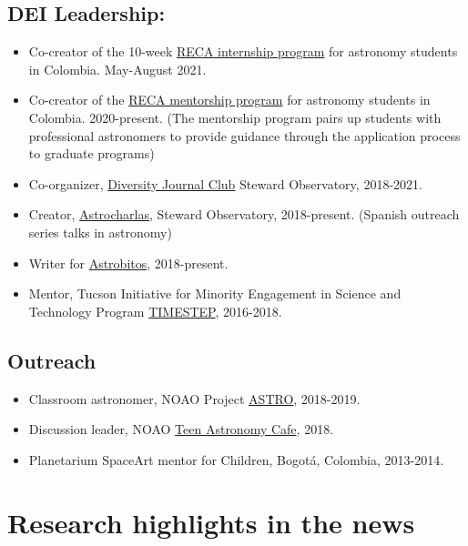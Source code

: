 \documentclass[UTF8]{article}
\begin{document}
\subsection*{DEI Leadership:}
\begin{itemize}
  \setlength\itemsep{0.0em}
  \renewcommand\labelitemi{$\cdot$}
\item Co-creator of the 10-week
  \href{https://recastronomia.github.io/internship/}{RECA internship program}
  for astronomy students in Colombia. May-August 2021.
\item Co-creator of the \href{https://recastronomia.github.io/mentores/}{RECA mentorship program} for astronomy students in Colombia. 2020-present.
  (The mentorship program pairs up students with professional astronomers to
  provide guidance through the application process to graduate programs)
\item Co-organizer,
  \href{https://www.as.arizona.edu/diversity_coffee/}{Diversity Journal Club} Steward Observatory, 2018-2021.
\item Creator, \href{https://astrocharlas.github.io/}{Astrocharlas},
Steward Observatory, 2018-present.
 (Spanish outreach series talks in astronomy)
\item Writer for \href{https://astrobitos.org/}{Astrobitos}, 2018-present.
\item Mentor, Tucson Initiative for Minority Engagement in Science and Technology Program \href{https://lavinia.as.arizona.edu/~timestep/}{TIMESTEP}, 2016-2018.
\end{itemize}

\subsection*{Outreach}
\begin{itemize}
  \setlength\itemsep{0.0em}
  \renewcommand\labelitemi{$\cdot$}
\item Classroom astronomer, NOAO Project \href{https://www.noao.edu/education/astro/}{ASTRO}, 2018-2019.
\item Discussion leader, NOAO \href{http://www.teenastronomycafe.org/}{Teen Astronomy Cafe}, 2018.
\item Planetarium SpaceArt mentor for Children, Bogot\'a, Colombia, 2013-2014.
\end{itemize}

\section*{Research highlights in the news}
\end{document}
